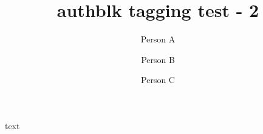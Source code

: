 \documentclass{article}
\title{authblk tagging test - 2}
\author[1]{Person A}
\author[1]{Person B}
\affil[1]{Uni 1}
\author[2]{Person C}
\affil[2]{Uni 2}
\begin{document}
\maketitle

text
\end{document}
